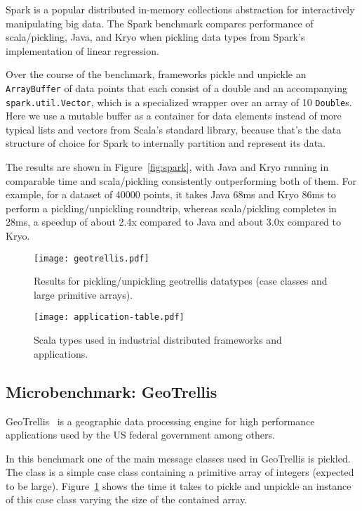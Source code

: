 Spark is a popular distributed in-memory collections abstraction for interactively manipulating big data.
The Spark benchmark compares performance of scala/pickling, Java, and Kryo when pickling data types from Spark's implementation of linear regression.

Over the course of the benchmark, frameworks pickle and unpickle an
\verb|ArrayBuffer| of data points that each consist of a double
and an accompanying \verb|spark.util.Vector|, which
is a specialized wrapper over an array of 10 \verb|Double|s. Here we use a
mutable buffer as a container for data elements instead
of more typical lists and vectors from Scala's standard library,
because that's the data structure of choice for Spark
to internally partition and represent its data.

The results are shown in Figure~\ref{fig:spark}, with Java and Kryo
running in comparable time and scala/pickling consistently outperforming both of them. For example, for a dataset of 40000 points, it takes Java 68ms and Kryo 86ms to perform a pickling/unpickling roundtrip, whereas scala/pickling completes in 28ms, a speedup of about 2.4x compared to Java and about 3.0x compared to Kryo.

\begin{figure}[ht!]
 \centering
 \texttt{[image: geotrellis.pdf]}
 \caption{Results for pickling/unpickling geotrellis datatypes (case classes and large primitive arrays).}
 \label{fig:geotrellis}
\end{figure}

\begin{figure*}[ht!]
 \centering
 \texttt{[image: application-table.pdf]}
 \vspace{-1em}
 \caption{Scala types used in industrial distributed frameworks and applications.}
 \label{fig:application-table}
\end{figure*}

\subsection{Microbenchmark: GeoTrellis}

GeoTrellis~\cite{GeoTrellis} is a geographic data processing engine for high performance applications used by the US federal government among others.

In this benchmark one of the main message classes used in GeoTrellis is pickled. The class is a simple case class containing a primitive array of integers (expected to be large). Figure~\ref{fig:geotrellis} shows the time it takes to pickle and unpickle an instance of this case class varying the size of the contained array.

